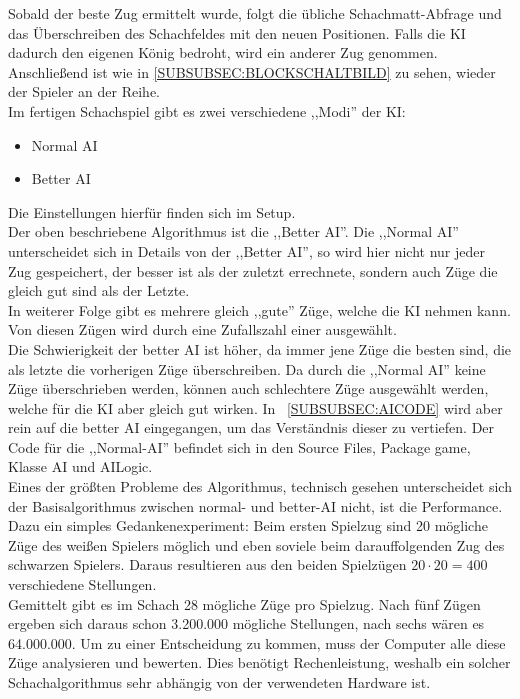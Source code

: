\documentclass[12pt,a4paper]{article}
\begin{document}
Sobald der beste Zug ermittelt wurde, folgt die übliche Schachmatt-Abfrage und das Überschreiben des Schachfeldes mit den neuen Positionen. Falls die KI dadurch den eigenen König bedroht, wird ein anderer Zug genommen. Anschließend ist wie in \ref{SUBSUBSEC:BLOCKSCHALTBILD} zu sehen, wieder der Spieler an der Reihe. \\[2ex]
Im fertigen Schachspiel gibt es zwei verschiedene ,,Modi'' der KI:
\begin{itemize}
	\item{Normal AI}
	\item{Better AI}
\end{itemize}
Die Einstellungen hierfür finden sich im Setup.\\
Der oben beschriebene Algorithmus ist die ,,Better AI''. Die ,,Normal AI'' unterscheidet sich in Details von der ,,Better AI'', so wird hier nicht nur jeder Zug gespeichert, der besser ist als der zuletzt errechnete, sondern auch Züge die gleich gut sind als der Letzte. \\
In weiterer Folge gibt es mehrere gleich ,,gute'' Züge, welche die KI nehmen kann. Von diesen Zügen wird durch eine Zufallszahl einer ausgewählt. \\
Die Schwierigkeit der better AI ist höher, da immer jene Züge die besten sind, die als letzte die vorherigen Züge überschreiben. Da durch die ,,Normal AI'' keine Züge überschrieben werden, können auch schlechtere Züge ausgewählt werden, welche für die KI aber gleich gut wirken. In ~\ref{SUBSUBSEC:AICODE} wird aber rein auf die better AI eingegangen, um das Verständnis dieser zu vertiefen. Der Code für die ,,Normal-AI'' befindet sich in den Source Files, Package game, Klasse AI und AILogic. \\[2ex]
Eines der größten Probleme des Algorithmus, technisch gesehen unterscheidet sich der Basisalgorithmus zwischen normal- und better-AI nicht, ist die Performance. Dazu ein simples Gedankenexperiment: Beim ersten Spielzug sind 20 mögliche Züge des weißen Spielers möglich und eben soviele beim darauffolgenden Zug des schwarzen Spielers. Daraus resultieren aus den beiden Spielzügen \(20 \cdot 20 = 400\) verschiedene Stellungen. \\
Gemittelt gibt es im Schach 28 mögliche Züge pro Spielzug. Nach fünf Zügen ergeben sich daraus schon 3.200.000 mögliche Stellungen, nach sechs wären es 64.000.000. Um zu einer Entscheidung zu kommen, muss der Computer alle diese Züge analysieren und bewerten. Dies benötigt Rechenleistung, weshalb ein solcher Schachalgorithmus sehr abhängig von der verwendeten Hardware ist. \\[1ex]
\end{document}
